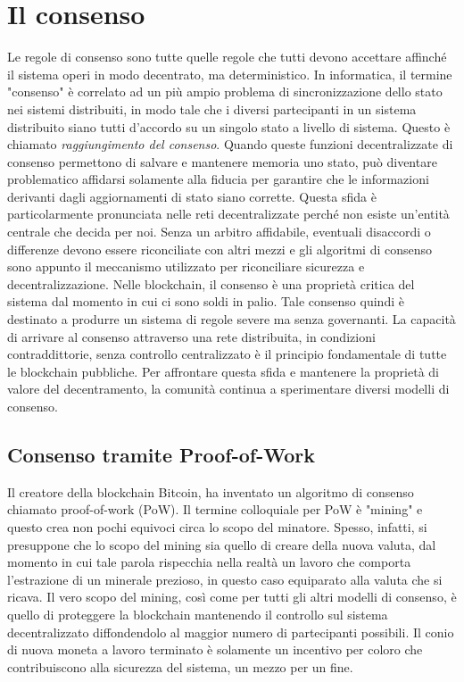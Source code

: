 \section{Il consenso}
\label{ethereum-il-consenso}
Le regole di consenso sono tutte quelle regole che tutti devono accettare affinché il sistema operi in modo decentrato, ma deterministico. In informatica, il termine "consenso" è correlato ad un più ampio problema di sincronizzazione dello stato nei sistemi distribuiti, in modo tale che i diversi partecipanti in un sistema distribuito siano tutti d'accordo su un singolo stato a livello di sistema. Questo è chiamato \textit{raggiungimento del consenso}. Quando queste funzioni decentralizzate di consenso permettono di salvare e mantenere memoria uno stato, può diventare problematico affidarsi solamente alla fiducia per garantire che le informazioni derivanti dagli aggiornamenti di stato siano corrette. Questa sfida è particolarmente pronunciata nelle reti decentralizzate perché non esiste un'entità centrale che decida per noi. Senza un arbitro affidabile, eventuali disaccordi o differenze devono essere riconciliate con altri mezzi e gli algoritmi di consenso sono appunto il meccanismo utilizzato per riconciliare sicurezza e decentralizzazione. Nelle blockchain, il consenso è una proprietà critica del sistema dal momento in cui ci sono soldi in palio. Tale consenso quindi è destinato a produrre un sistema di regole severe ma senza governanti. La capacità di arrivare al consenso attraverso una rete distribuita, in condizioni contraddittorie, senza controllo centralizzato è il principio fondamentale di tutte le blockchain pubbliche. Per affrontare questa sfida e mantenere la proprietà di valore del decentramento, la comunità continua a sperimentare diversi modelli di consenso.

\subsection{Consenso tramite Proof-of-Work}
Il creatore della blockchain Bitcoin, ha inventato un algoritmo di consenso chiamato proof-of-work (PoW). Il termine colloquiale per PoW è "mining" e questo crea non pochi equivoci circa lo scopo del minatore. Spesso, infatti, si presuppone che lo scopo del mining sia quello di creare della nuova valuta, dal momento in cui tale parola rispecchia nella realtà un lavoro che comporta l'estrazione di un minerale prezioso, in questo caso equiparato alla valuta che si ricava. Il vero scopo del mining, così come per tutti gli altri modelli di consenso, è quello di proteggere la blockchain mantenendo il controllo sul sistema decentralizzato diffondendolo al maggior numero di partecipanti possibili. Il conio di nuova moneta a lavoro terminato è solamente un incentivo per coloro che contribuiscono alla sicurezza del sistema, un mezzo per un fine.

